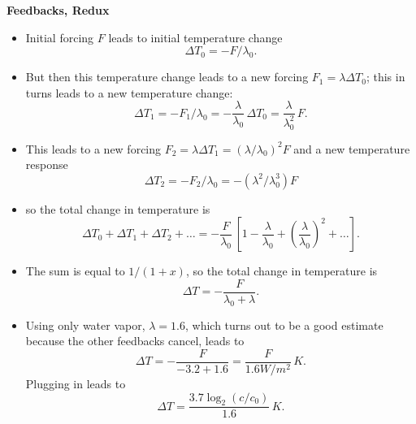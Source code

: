 \documentclass[11pt]{book}
\def\be{\begin{equation}}
\def\ee{\end{equation}}
\newcommand\bei{\begin{itemize}}
\newcommand\eei{\end{itemize}}
\begin{document}
{\bf Feedbacks, Redux}
\bei
\item Initial forcing $F$ leads to initial temperature change
\be
\Delta T_0 = -F/\lambda_0.\ee
\item But then this temperature change leads to a new forcing $F_1=\lambda \Delta T_0$; this in turns leads to a new temperature change:
\be
\Delta T_1 = -F_1/\lambda_0 = -\frac{\lambda}{\lambda_0}\, \Delta T_0 = \frac{\lambda}{\lambda_0^2}\,F.\ee 
\item This leads to a new forcing $F_2=\lambda \Delta T_1 = (\lambda/\lambda_0)^2 F$ and a new temperature response
\be
\Delta T_2 = -F_2/\lambda_0 = -(\lambda^2/\lambda_0^3) F
\ee
\item so the total change in temperature is
\be
\Delta T_0 + \Delta T_1 + \Delta T_2 + \ldots = -\frac{F}{\lambda_0}\, \left[ 1 - \frac{\lambda}{\lambda_0} + \left( \frac{\lambda}{\lambda_0} \right)^2 + \ldots \right].
\ee
\item The sum is equal to $1/(1+x)$, so the total change in temperature is
\be
\Delta T =  -\frac{F}{\lambda_0 + \lambda}.\ee
\item Using only water vapor, $\lambda=1.6$, which turns out to be a good estimate because the other feedbacks cancel, leads to
\be
\Delta T = -\frac{F}{-3.2+1.6} = \frac{F}{1.6 W/m^2} \, K.\ee
Plugging in leads to 
\be
\Delta T = \frac{3.7\log_2(c/c_0)}{1.6} \, K.\ee
\eei
\end{document}
